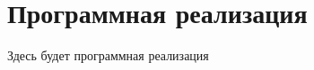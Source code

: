 \renewcommand{\chaptertitle}{Программная реализация}  %
\chapter{\chaptertitle}\label{ch:ch8}

Здесь будет программная реализация